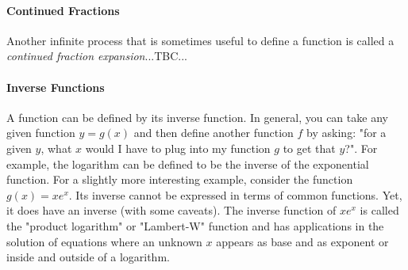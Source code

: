 \paragraph{Continued Fractions}
Another infinite process that is sometimes useful to define a function is called a \emph{continued fraction expansion}...TBC...

\paragraph{Inverse Functions}
A function can be defined by its inverse function. In general, you can take any given function $y = g(x)$ and then define another function $f$ by asking: "for a given $y$, what $x$ would I have to plug into my function $g$ to get that $y$?". For example, the logarithm can be defined to be the inverse of the exponential function. For a slightly more interesting example, consider the function $g(x) = x e^x$. Its inverse cannot be expressed in terms of common functions. Yet, it does have an inverse (with some caveats). The inverse function of $x e^x$ is called the "product logarithm" or "Lambert-W" function and has applications in the solution of equations where an unknown $x$ appears as base and as exponent or inside and outside of a logarithm.



